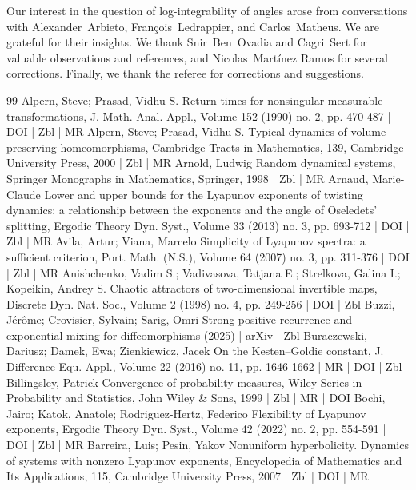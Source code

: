 \documentclass[10pt]{amsart}
\theoremstyle{definition}\newtheorem{defi}[theo]{Definition}\newtheorem{rema}[theo]{Remark}\newtheorem{exam}[theo]{Example}\newtheorem{exem}[theo]{Example}\newtheorem{nota}[theo]{Notation}
\begin{document}
Our interest in the question of log-integrability of angles arose from conversations with Alexander~Arbieto, François~Ledrappier, and Carlos~Matheus. We are grateful for their insights. We thank Snir~Ben~Ovadia and Cagri~Sert for valuable observations and references, and Nicolas~Mart\'inez Ramos for several corrections. Finally, we thank the referee for corrections and suggestions.




\begin{thebibliography}{99}
 Alpern, Steve; Prasad, Vidhu S. Return times for nonsingular measurable transformations, J. Math. Anal. Appl., Volume 152 (1990) no. 2, pp. 470-487 | DOI | Zbl | MR
 Alpern, Steve; Prasad, Vidhu S. Typical dynamics of volume preserving homeomorphisms, Cambridge Tracts in Mathematics, 139, Cambridge University Press, 2000 | Zbl | MR
 Arnold, Ludwig Random dynamical systems, Springer Monographs in Mathematics, Springer, 1998 | Zbl | MR
 Arnaud, Marie-Claude Lower and upper bounds for the Lyapunov exponents of twisting dynamics: a relationship between the exponents and the angle of Oseledets’ splitting, Ergodic Theory Dyn. Syst., Volume 33 (2013) no. 3, pp. 693-712 | DOI | Zbl | MR
 Avila, Artur; Viana, Marcelo Simplicity of Lyapunov spectra: a sufficient criterion, Port. Math. (N.S.), Volume 64 (2007) no. 3, pp. 311-376 | DOI | Zbl | MR
 Anishchenko, Vadim S.; Vadivasova, Tatjana E.; Strelkova, Galina I.; Kopeikin, Andrey S. Chaotic attractors of two-dimensional invertible maps, Discrete Dyn. Nat. Soc., Volume 2 (1998) no. 4, pp. 249-256 | DOI | Zbl
 Buzzi, Jérôme; Crovisier, Sylvain; Sarig, Omri Strong positive recurrence and exponential mixing for diffeomorphisms (2025) | arXiv | Zbl
 Buraczewski, Dariusz; Damek, Ewa; Zienkiewicz, Jacek On the Kesten–Goldie constant, J. Difference Equ. Appl., Volume 22 (2016) no. 11, pp. 1646-1662 | MR | DOI | Zbl
 Billingsley, Patrick Convergence of probability measures, Wiley Series in Probability and Statistics, John Wiley \& Sons, 1999 | Zbl | MR | DOI
 Bochi, Jairo; Katok, Anatole; Rodriguez-Hertz, Federico Flexibility of Lyapunov exponents, Ergodic Theory Dyn. Syst., Volume 42 (2022) no. 2, pp. 554-591 | DOI | Zbl | MR
 Barreira, Luis; Pesin, Yakov Nonuniform hyperbolicity. Dynamics of systems with nonzero Lyapunov exponents, Encyclopedia of Mathematics and Its Applications, 115, Cambridge University Press, 2007 | Zbl | DOI | MR

\end{thebibliography}
\end{document}

